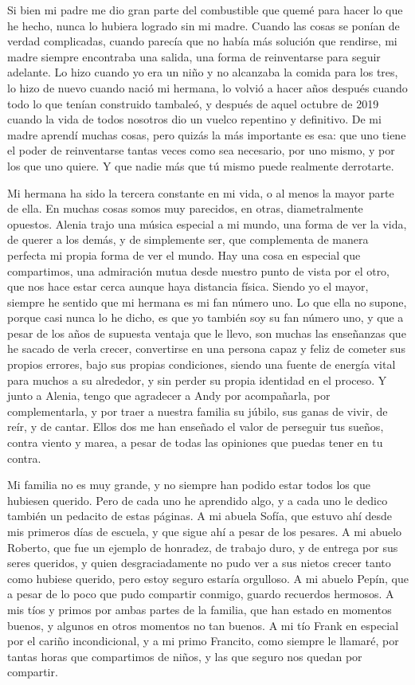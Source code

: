 Si bien mi padre me dio gran parte del combustible que quemé para hacer lo que he hecho, nunca lo hubiera logrado sin mi madre.
Cuando las cosas se ponían de verdad complicadas, cuando parecía que no había más solución que rendirse, mi madre siempre encontraba una salida, una forma de reinventarse para seguir adelante.
Lo hizo cuando yo era un niño y no alcanzaba la comida para los tres, lo hizo de nuevo cuando nació mi hermana, lo volvió a hacer años después cuando todo lo que tenían construido tambaleó, y después de aquel octubre de 2019 cuando la vida de todos nosotros dio un vuelco repentino y definitivo.
De mi madre aprendí muchas cosas, pero quizás la más importante es esa: que uno tiene el poder de reinventarse tantas veces como sea necesario, por uno mismo, y por los que uno quiere.
Y que nadie más que tú mismo puede realmente derrotarte.

Mi hermana ha sido la tercera constante en mi vida, o al menos la mayor parte de ella.
En muchas cosas somos muy parecidos, en otras, diametralmente opuestos.
Alenia trajo una música especial a mi mundo, una forma de ver la vida, de querer a los demás, y de simplemente ser, que complementa de manera perfecta mi propia forma de ver el mundo.
Hay una cosa en especial que compartimos, una admiración mutua desde nuestro punto de vista por el otro, que nos hace estar cerca aunque haya distancia física.
Siendo yo el mayor, siempre he sentido que mi hermana es mi fan número uno.
Lo que ella no supone, porque casi nunca lo he dicho, es que yo también soy su fan número uno, y que a pesar de los años de supuesta ventaja que le llevo, son muchas las enseñanzas que he sacado de verla crecer, convertirse en una persona capaz y feliz de cometer sus propios errores, bajo sus propias condiciones, siendo una fuente de energía vital para muchos a su alrededor, y sin perder su propia identidad en el proceso.
Y junto a Alenia, tengo que agradecer a Andy por acompañarla, por complementarla, y por traer a nuestra familia su júbilo, sus ganas de vivir, de reír, y de cantar.
Ellos dos me han enseñado el valor de perseguir tus sueños, contra viento y marea, a pesar de todas las opiniones que puedas tener en tu contra.

Mi familia no es muy grande, y no siempre han podido estar todos los que hubiesen querido. Pero de cada uno he aprendido algo, y a cada uno le dedico también un pedacito de estas páginas.
A mi abuela Sofía, que estuvo ahí desde mis primeros días de escuela, y que sigue ahí a pesar de los pesares.
A mi abuelo Roberto, que fue un ejemplo de honradez, de trabajo duro, y de entrega por sus seres queridos, y quien desgraciadamente no pudo ver a sus nietos crecer tanto como hubiese querido, pero estoy seguro estaría orgulloso.
A mi abuelo Pepín, que a pesar de lo poco que pudo compartir conmigo, guardo recuerdos hermosos. A mis tíos y primos por ambas partes de la familia, que han estado en momentos buenos, y algunos en otros momentos no tan buenos.
A mi tío Frank en especial por el cariño incondicional, y a mi primo Francito, como siempre le llamaré, por tantas horas que compartimos de niños, y las que seguro nos quedan por compartir.


